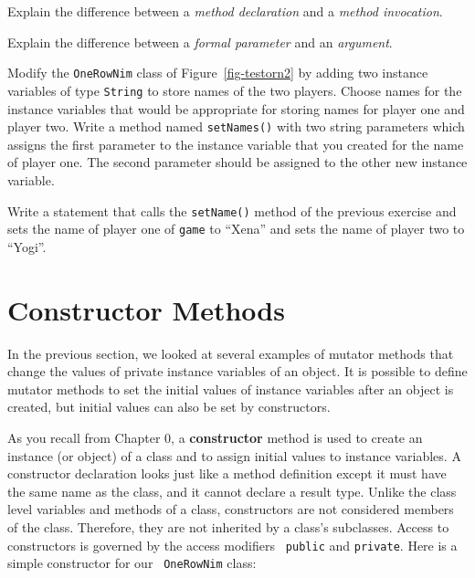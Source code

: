 \begin{SSTUDY}
\item  Explain the difference between a {\it  method declaration} and
a {\it method invocation}.

\item  Explain the difference between a {\it formal parameter} and
an {\it argument}.

\item  Modify the {\tt OneRowNim} class of Figure~\ref{fig-testorn2}
by adding two instance variables of type {\tt String} to store names
of the two players. Choose names for the instance variables that would
be appropriate for storing names for player one and player two.  Write
a method named {\tt setNames()} with two string parameters which
assigns the first parameter to the instance variable that you created
for the name of player one.  The second parameter should be assigned
to the other new instance variable.

\item  Write a statement that calls the {\tt setName()} method of
the previous exercise and sets the name of player one of {\tt game}
to ``Xena'' and sets the name of player two to ``Yogi''.
\end{SSTUDY}

\section{Constructor Methods}
\label{sec-constructors}
\noindent In the previous section, we looked at several examples of 
mutator methods that change the values of private instance variables
of an object.  It is possible to define mutator methods to set the
initial values of instance variables after an object is created, but
initial values can also be set by constructors.

As you recall from Chapter 0, a {\bf constructor}
method is used to create an
instance (or object) of a class and to assign initial values to
instance variables.  A constructor declaration looks just like a
method definition except it must have the same name as the class, and
it cannot declare a result type.  Unlike the class level variables and
methods of a class, constructors are not considered members of the
class.  Therefore, they are not inherited by a class's subclasses.
Access to constructors is governed by the access modifiers {\tt
public} and {\tt private}.  Here is a simple constructor for our {\tt
OneRowNim} class:

